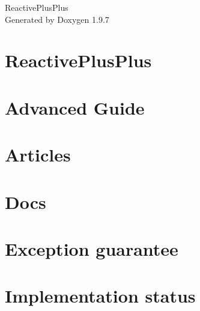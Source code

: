 \documentclass[twoside]{book}
\newcommand{\+}{\discretionary{\mbox{\scriptsize$\hookleftarrow$}}{}{}}
\newcommand{\clearemptydoublepage}{%
    \newpage{\pagestyle{empty}\cleardoublepage}%
  }
\begin{document}
  \raggedbottom
    \hypersetup{pageanchor=false,
                bookmarksnumbered=true,
                pdfencoding=unicode
               }
  \begin{titlepage}
  \vspace*{7cm}
  \begin{center}%
  {\Large Reactive\+Plus\+Plus}\\
  \vspace*{1cm}
  {\large Generated by Doxygen 1.9.7}\\
  \end{center}
  \end{titlepage}
  \clearemptydoublepage
  \tableofcontents
  \clearemptydoublepage
  \hypersetup{pageanchor=true}
\chapter{Reactive\+Plus\+Plus}
\label{index}\hypertarget{index}{}
\chapter{Advanced Guide}
\label{md_docs_2_advanced}

\chapter{Articles}
\label{md_docs_2_articles}

\chapter{Docs}
\label{docs}

\chapter{Exception guarantee}
\label{md_docs_2_exception_01_guarantee}

\chapter{Implementation status}
\label{md_docs_2_implementation_01_status}

\end{document}
